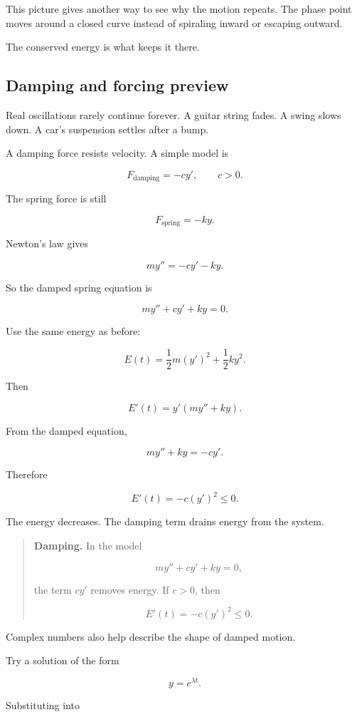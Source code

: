 This picture gives another way to see why the motion repeats.  The phase point moves
around a closed curve instead of spiraling inward or escaping outward.

The conserved energy is what keeps it there.

\subsection{Damping and forcing preview}
\label{subsec:damping-forcing-preview}

Real oscillations rarely continue forever.  A guitar string fades.  A swing slows down.
A car's suspension settles after a bump.

A damping force resists velocity.  A simple model is

\[
F_{\text{damping}}=-cy',
\qquad c>0.
\]

The spring force is still

\[
F_{\text{spring}}=-ky.
\]

Newton's law gives

\[
my''=-cy'-ky.
\]

So the damped spring equation is

\[
\boxed{
my''+cy'+ky=0.
}
\]

Use the same energy as before:

\[
E(t)=\frac12m(y')^2+\frac12ky^2.
\]

Then

\[
E'(t)=y'(my''+ky).
\]

From the damped equation,

\[
my''+ky=-cy'.
\]

Therefore

\[
\boxed{
E'(t)=-c(y')^2\le0.
}
\]

The energy decreases.  The damping term drains energy from the system.

\begin{quote}
\textbf{Damping.}
In the model

\[
my''+cy'+ky=0,
\]

the term \(cy'\) removes energy.  If \(c>0\), then

\[
E'(t)=-c(y')^2\le0.
\]
\end{quote}

Complex numbers also help describe the shape of damped motion.

Try a solution of the form

\[
y=e^{\lambda t}.
\]

Substituting into

